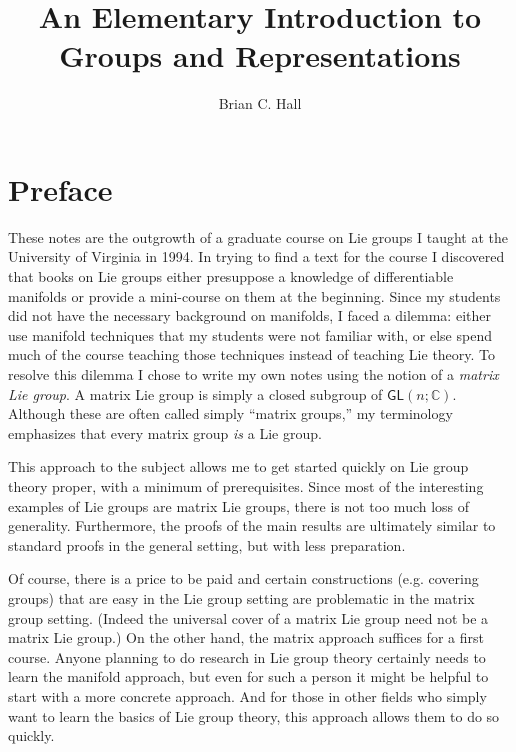 \documentclass{amsbook}
\theoremstyle{plain}
\numberwithin{equation}{chapter}
\numberwithin{theorem}{chapter}
\begin{document}
\frontmatter
\title[Groups and Representations]{An Elementary Introduction to Groups and Representations}
\author{Brian C. Hall}
\address{University of Notre Dame\\
Department of Mathematics\\
Notre Dame IN 46556 USA}
\maketitle
\tableofcontents


\section{Preface}

These notes are the outgrowth of a graduate course on Lie groups I taught at
the University of Virginia in 1994. In trying to find a text for the course I
discovered that books on Lie groups either presuppose a knowledge of
differentiable manifolds or provide a mini-course on them at the beginning.
Since my students did not have the necessary background on manifolds, I faced
a dilemma: either use manifold techniques that my students were not familiar
with, or else spend much of the course teaching those techniques instead of
teaching Lie theory. To resolve this dilemma I chose to write my own notes
using the notion of a \textit{matrix Lie group}. A matrix Lie group is simply
a closed subgroup of $\mathsf{GL}(n;\mathbb{C}).$ Although these are often
called simply ``matrix groups,'' my terminology emphasizes that every matrix
group \textit{is} a Lie group.

This approach to the subject allows me to get started quickly on Lie group
theory proper, with a minimum of prerequisites. Since most of the interesting
examples of Lie groups are matrix Lie groups, there is not too much loss of
generality. Furthermore, the proofs of the main results are ultimately similar
to standard proofs in the general setting, but with less preparation.

Of course, there is a price to be paid and certain constructions (e.g.
covering groups) that are easy in the Lie group setting are problematic in the
matrix group setting. (Indeed the universal cover of a matrix Lie group need
not be a matrix Lie group.) On the other hand, the matrix approach suffices
for a first course. Anyone planning to do research in Lie group theory
certainly needs to learn the manifold approach, but even for such a person it
might be helpful to start with a more concrete approach. And for those in
other fields who simply want to learn the basics of Lie group theory, this
approach allows them to do so quickly.
\end{document}
